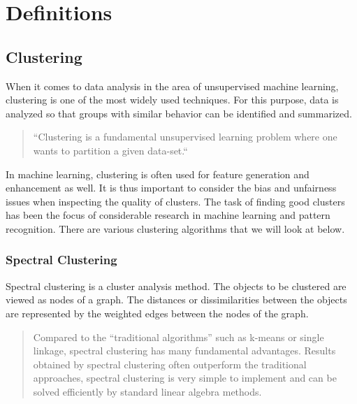 \section{Definitions}



\subsection{Clustering}

When it comes to data analysis in the area of unsupervised machine learning, clustering is one of the most widely used techniques. For this purpose, data is analyzed so that groups with similar behavior can be identified and summarized. \autocite[]{VonLuxburg2007}

\begin{quote}
    ``Clustering is a fundamental unsupervised learning problem where one wants to partition a given data-set.``

\autocite[1]{Bera2019}
\end{quote}

In machine learning, clustering is often used for feature generation and enhancement as well. It is thus important to consider the bias and unfairness issues when inspecting the quality of clusters.\autocite[]{Bera2019}
The task of finding good clusters has been the focus of considerable research in machine learning and pattern recognition.\autocite[]{Ng2001}
There are various clustering algorithms that we will look at below.


\subsubsection{Spectral Clustering}

Spectral clustering is a cluster analysis method. The objects to be clustered are viewed as nodes of a graph. The distances or dissimilarities between the objects are represented by the weighted edges between the nodes of the graph.

\begin{quote}
Compared to the “traditional algorithms” such as k-means or single linkage, spectral clustering has many fundamental advantages. Results obtained by spectral clustering often outperform the traditional approaches, spectral clustering is very simple to implement and can be solved efficiently by standard linear algebra methods.

\autocite[1]{VonLuxburg2007}
\end{quote}


